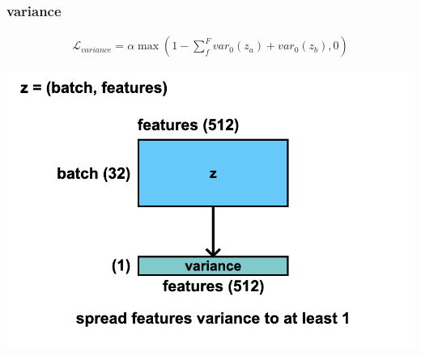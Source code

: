 \documentclass{beamer}
\begin{document}
\begin{frame}
  
  \frametitle{variance}
 
  \begin{align*}
    \mathcal{L}_{variance} = \alpha \max \left( 1 - \sum_{f}^{F} var_{0}(z_a) + var_{0}(z_b), 0 \right)
  \end{align*}  

  \centering
  \includegraphics[scale=0.2]{../diagrams/cnd/variance.png}

\end{frame}
\end{document}
